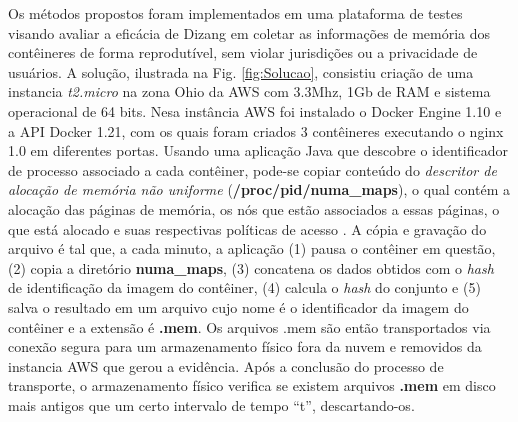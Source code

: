 \documentclass[conference]{IEEEtran}
\newcommand{\marcosT}[1]{{\color{red}{TODO: #1}}}
\newcommand{\fancyname}{Dizang }
\begin{document}
Os métodos propostos foram implementados em uma plataforma de testes visando avaliar a eficácia de \fancyname em coletar as informações de memória dos contêineres de forma reprodutível, sem violar jurisdições ou a privacidade de usuários.
%
A solução, ilustrada na Fig. \ref{fig:Solucao}, consistiu criação de uma instancia \textit{t2.micro} na zona Ohio da AWS com 3.3Mhz, 1Gb de RAM e sistema operacional de 64 bits. 
%
Nesa instância AWS foi instalado o Docker Engine 1.10 e a API Docker 1.21, com os quais foram criados 3 contêineres executando o nginx 1.0 em diferentes portas. 
%
Usando uma aplicação Java que descobre o identificador de processo associado a cada contêiner, pode-se copiar conteúdo do \textit{descritor de alocação de memória não uniforme} (\textbf{/proc/pid/numa\_maps}), o qual contém a alocação das páginas de memória, os nós que estão associados a essas páginas, o que está alocado e suas respectivas políticas de acesso \cite{UnixManPages_numa_maps}.
%
A cópia e gravação do arquivo é tal que, a cada minuto, a aplicação (1) pausa o contêiner em questão, (2) copia a diretório \textbf{numa\_maps}, (3)  concatena os dados obtidos com o \textit{hash} de identificação da imagem do contêiner, (4) calcula o \textit{hash} do conjunto e (5) salva o resultado em um arquivo cujo nome é o identificador da imagem do contêiner e a extensão é \textbf{.mem}. 
%
Os arquivos .mem são então transportados via conexão segura para um armazenamento físico fora da nuvem e removidos da instancia AWS que gerou a evidência.
%
Após a conclusão do processo de transporte, o armazenamento físico verifica se existem arquivos \textbf{.mem} em disco mais antigos que um certo intervalo de tempo ``t'', descartando-os.
%

\end{document}
